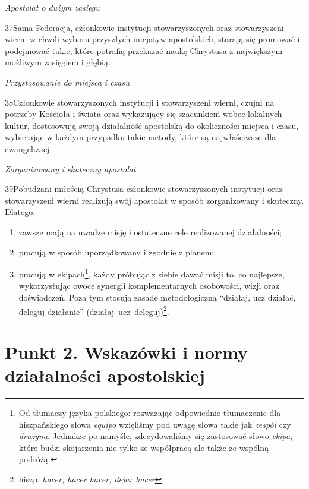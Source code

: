 ﻿\documentclass{book}
\newcommand{\lett}[1]{\lettrine[findent=6pt]{#1}}
\newcommand{\ssec}[1]{\vspace{1em}\textit{#1}\vspace{.5em}\nopagebreak}
\begin{document}
\ssec{Apostolat o dużym zasięgu}


\lett{37} Sama Federacja, członkowie instytucji stowarzyszonych oraz stowarzyszeni wierni w chwili wyboru przyszłych inicjatyw apostolskich, starają się promować i podejmować takie, które potrafią przekazać naukę Chrystusa z największym możliwym zasięgiem i głębią.
 
\ssec{Przystosowanie do miejsca i czasu}


\lett{38} Członkowie stowarzyszonych instytucji i stowarzyszeni wierni, czujni na potrzeby Kościoła i świata oraz wykazujący się szacunkiem wobec lokalnych kultur, dostosowują swoją działalność apostolską do okoliczności miejsca i czasu, wybierając w każdym przypadku takie metody, które są najwłaściwsze dla ewangelizacji.
 
\ssec{Zorganizowany i skuteczny apostolat}


\lett{39} Pobudzani miłością Chrystusa członkowie stowarzyszonych instytucji oraz stowarzyszeni wierni realizują swój apostolat w sposób zorganizowany i skuteczny. Dlatego:


\begin{enumerate}


\item zawsze mają na uwadze misję i ostateczne cele realizowanej działalności;


\item pracują w sposób uporządkowany i zgodnie z planem;


\item pracują w ekipach\footnote{Od tłumaczy języka polskiego: rozważając odpowiednie tłumaczenie dla hiszpańskiego słowa {\em equipo} wzięliśmy pod uwagę słowa takie jak {\em zespół} czy {\em drużyna}. Jednakże po namyśle, zdecydowaliśmy się zastosować słowo {\em ekipa}, które budzi skojarzenia nie tylko ze współpracą ale także ze wspólną podróżą.}, każdy próbując z siebie dawać misji to, co najlepsze, wykorzystując owoce synergii komplementarnych osobowości, wizji oraz doświadczeń. Poza tym stosują zasadę metodologiczną “działaj, ucz działać, deleguj działanie” (działaj--ucz--deleguj)\footnote{hiszp. {\em hacer, hacer hacer, dejar hacer}}.


\end{enumerate}




\section{Punkt 2. Wskazówki i normy działalności apostolskiej}
\end{document}

